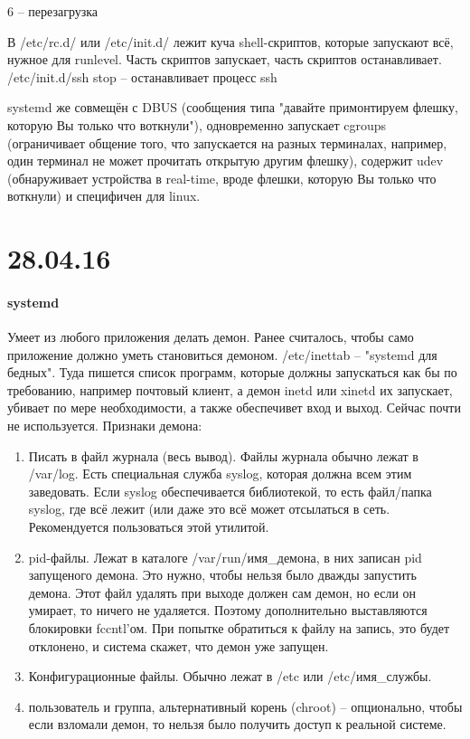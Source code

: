 \documentclass[a4paper,10pt]{article}
\begin{document}
\begin{enumerate}
6 -- перезагрузка

В /etc/rc.d/ или /etc/init.d/ лежит куча shell-скриптов, которые запускают всё, нужное для runlevel. Часть скриптов запускает, часть скриптов останавливает.
/etc/init.d/ssh stop -- останавливает процесс ssh

systemd же совмещён с DBUS (сообщения типа "давайте примонтируем флешку, которую Вы только что воткнули"), одновременно запускает cgroups (ограничивает общение того, что запускается на разных терминалах, например, один терминал не может прочитать открытую другим флешку), содержит udev (обнаруживает устройства в real-time, вроде флешки, которую Вы только что воткнули) и специфичен для linux.


\end{enumerate}


\section{28.04.16}
\paragraph{systemd}
Умеет из любого приложения делать демон.
Ранее считалось, чтобы само приложение должно уметь становиться демоном.
/etc/inettab -- "systemd для бедных". Туда пишется список программ, которые должны запускаться как бы по требованию, например почтовый клиент, а демон inetd или xinetd их запускает, убивает по мере необходимости, а также обеспечивет вход и выход. Сейчас почти не используется.
Признаки демона:
\begin{enumerate}
 \item Писать в файл журнала (весь вывод). Файлы журнала обычно лежат в /var/log.
 Есть специальная служба syslog, которая должна всем этим заведовать. Если syslog обеспечивается библиотекой, то есть файл/папка syslog, где всё лежит (или даже это всё может отсылаться в сеть. Рекомендуется пользоваться этой утилитой.
 \item pid-файлы. Лежат в каталоге /var/run/имя\_демона, в них записан pid запущеного демона. Это нужно, чтобы нельзя было дважды запустить демона. Этот файл удалять при выходе должен сам демон, но если он умирает, то ничего не удаляется. Поэтому дополнительно выставляются блокировки fccntl'ом. При попытке обратиться к файлу на запись, это будет отклонено, и система скажет, что демон уже запущен.
 \item Конфигурационные файлы. Обычно лежат в /etc или /etc/имя\_службы.
 \item пользователь и группа, альтернативный корень (chroot) -- опционально, чтобы если взломали демон, то нельзя было получить доступ к реальной системе.
\end{enumerate}
\end{document}
